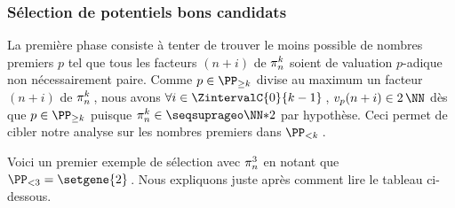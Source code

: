 \subsubsection{Sélection de potentiels bons candidats} \label{algo-select}

\leavevmode
\smallskip

La première phase consiste à tenter de trouver le moins possible de nombres premiers $p$ tel que tous les facteurs $(n+i)$ de $\consprod$ soient de valuation $p$-adique non nécessairement paire. 
Comme $p \in \PP_{\geq k}$ divise au maximum un facteur $(n+i)$ de $\consprod$\,, nous avons $\forall i \in \ZintervalC{0}{k-1}$\,, $\padicval{n+i} \in 2\,\NN$ dès que $p \in \PP_{\geq k}$ puisque  $\consprod \in \NNssquare$ par hypothèse. Ceci permet de cibler notre analyse sur les nombres premiers dans $\PP_{< k}$\,. 




\medskip

Voici un premier exemple de sélection avec $\consprod<3>$ en notant que $\PP_{< 3} = \setgene{2}$\,. Nous expliquons juste après comment lire le tableau ci-dessous.


\begin{center}
\end{center}


